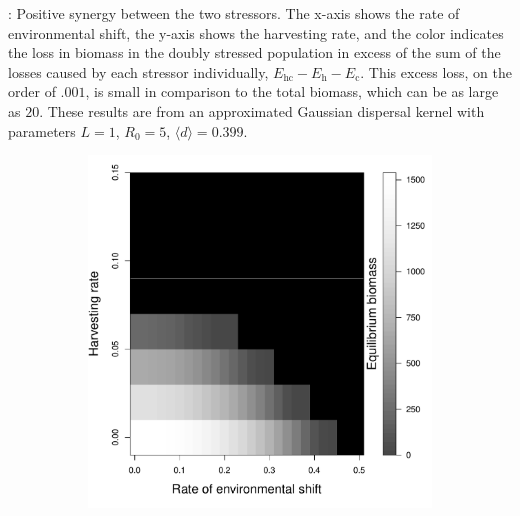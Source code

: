 \documentclass[12pt,english]{article}
\begin{document}
\pagebreak

: Positive synergy between the two stressors.  The x-axis shows the rate of environmental shift, the y-axis shows the harvesting rate, and the color indicates the loss in biomass in the doubly stressed population in excess of the sum of the losses caused by each stressor individually, $E_\text{hc}-E_\text{h}-E_\text{c}$.  This excess loss, on the order of $.001$, is small in comparison to the total biomass, which can be as large as $20$.  These results are from an approximated Gaussian dispersal kernel with parameters $L=1$, $R_0=5$, $\langle d \rangle = 0.399$.

\pagebreak

\begin{figure}[htbp]

\begin{subfigure}{.33\textwidth}
\subcaption{}
\includegraphics[width=\textwidth]{plots/eqbiomass_sim.pdf}
\label{nomang}
\end{subfigure}
\begin{subfigure}{.33\textwidth}
\subcaption{}

\end{subfigure}
\end{figure}
\end{document}
